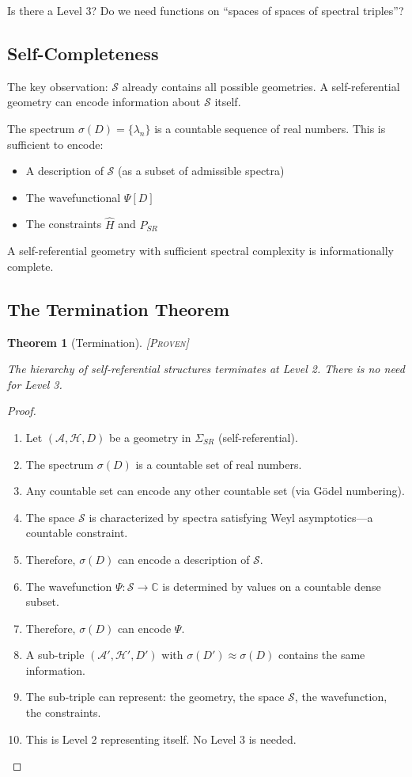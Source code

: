 \documentclass[11pt,a4paper]{article}
\newtheorem{theorem}{Theorem}[section]
\theoremstyle{definition}
\theoremstyle{remark}
\begin{document}
Is there a Level 3? Do we need functions on ``spaces of spaces of spectral triples''?

\subsection{Self-Completeness}

The key observation: $\mathcal{S}$ already contains all possible geometries. A self-referential geometry can encode information about $\mathcal{S}$ itself.

The spectrum $\sigma(D) = \{\lambda_n\}$ is a countable sequence of real numbers. This is sufficient to encode:
\begin{itemize}
    \item A description of $\mathcal{S}$ (as a subset of admissible spectra)
    \item The wavefunctional $\Psi[D]$
    \item The constraints $\hat{H}$ and $P_{SR}$
\end{itemize}

A self-referential geometry with sufficient spectral complexity is informationally complete.

\subsection{The Termination Theorem}

\begin{theorem}[Termination]
\textsc{[Proven]}

The hierarchy of self-referential structures terminates at Level 2. There is no need for Level 3.
\end{theorem}

\begin{proof}
\begin{enumerate}
    \item Let $(\mathcal{A}, \mathcal{H}, D)$ be a geometry in $\Sigma_{SR}$ (self-referential).
    \item The spectrum $\sigma(D)$ is a countable set of real numbers.
    \item Any countable set can encode any other countable set (via G\"odel numbering).
    \item The space $\mathcal{S}$ is characterized by spectra satisfying Weyl asymptotics---a countable constraint.
    \item Therefore, $\sigma(D)$ can encode a description of $\mathcal{S}$.
    \item The wavefunction $\Psi: \mathcal{S} \to \mathbb{C}$ is determined by values on a countable dense subset.
    \item Therefore, $\sigma(D)$ can encode $\Psi$.
    \item A sub-triple $(\mathcal{A}', \mathcal{H}', D')$ with $\sigma(D') \approx \sigma(D)$ contains the same information.
    \item The sub-triple can represent: the geometry, the space $\mathcal{S}$, the wavefunction, the constraints.
    \item This is Level 2 representing itself. No Level 3 is needed. \qedhere
\end{enumerate}
\end{proof}
\end{document}
